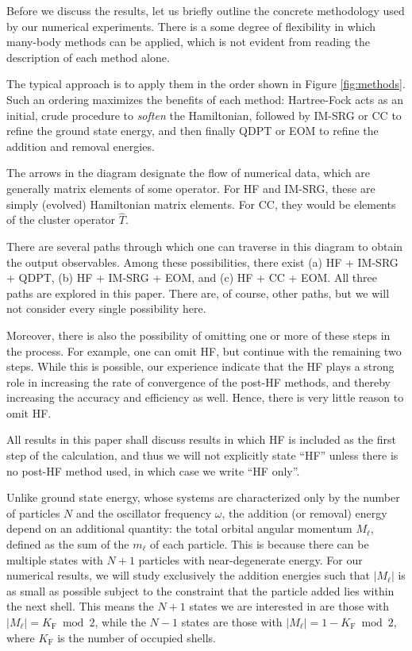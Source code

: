 Before we discuss the results, let us briefly outline the concrete methodology used by our numerical experiments.  There is a some degree of flexibility in which many-body methods can be applied, which is not evident from reading the description of each method alone.

The typical approach is to apply them in the order shown in Figure \ref{fig:methods}.  Such an ordering maximizes the benefits of each method: Hartree-Fock acts as an initial, crude procedure to \textit{soften} the Hamiltonian, followed by IM-SRG or CC to refine the ground state energy, and then finally QDPT or EOM to refine the addition and removal energies.

The arrows in the diagram designate the flow of numerical data, which are generally matrix elements of some operator.  For HF and IM-SRG, these are simply (evolved) Hamiltonian matrix elements.  For CC, they would be elements of the cluster operator $\hat{T}$.

There are several paths through which one can traverse in this diagram to obtain the output observables.  Among these possibilities, there exist (a) HF + IM-SRG + QDPT, (b) HF + IM-SRG + EOM, and (c) HF + CC + EOM.  All three paths are explored in this paper.  There are, of course, other paths, but we will not consider every single possibility here.

Moreover, there is also the possibility of omitting one or more of these steps in the process.  For example, one can omit HF, but continue with the remaining two steps.  While this is possible, our experience indicate that the HF plays a strong role in increasing the rate of convergence of the post-HF methods, and thereby increasing the accuracy and efficiency as well.  Hence, there is very little reason to omit HF.

All results in this paper shall discuss results in which HF is included as the first step of the calculation, and thus we will not explicitly state ``HF'' unless there is no post-HF method used, in which case we write ``HF only''.

Unlike ground state energy, whose systems are characterized only by the number of particles $N$ and the oscillator frequency $\omega$, the addition (or removal) energy depend on an additional quantity: the total orbital angular momentum $M_\ell$, defined as the sum of the $m_\ell$ of each particle.  This is because there can be multiple states with $N + 1$ particles with near-degenerate energy.  For our numerical results, we will study exclusively the addition energies such that $|M_\ell|$ is as small as possible subject to the constraint that the particle added lies within the next shell.  This means the $N + 1$ states we are interested in are those with $|M_\ell| = K_{\mathrm{F}} \bmod 2$, while the $N - 1$ states are those with $|M_\ell| = 1 - K_{\mathrm{F}} \bmod 2$, where $K_{\mathrm{F}}$ is the number of occupied shells.


